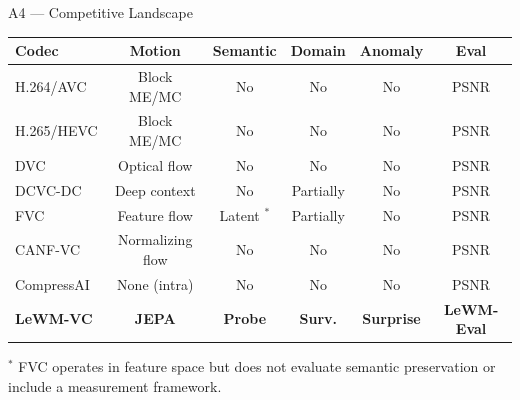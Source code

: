 \documentclass[aspectratio=169, professionalfonts, 10pt]{beamer}
\begin{document}
\begin{frame}{A4 --- Competitive Landscape}

  \begin{tabular}{lccccc}
    \toprule
    \textbf{Codec} & \textbf{Motion} & \textbf{Semantic} & \textbf{Domain} & \textbf{Anomaly} & \textbf{Eval} \\
    \midrule
    H.264/AVC  & Block ME/MC & No & No & No & PSNR \\
    H.265/HEVC & Block ME/MC & No & No & No & PSNR \\
    DVC        & Optical flow & No & No & No & PSNR \\
    DCVC-DC    & Deep context & No & Partially & No & PSNR \\
    FVC        & Feature flow & Latent $^\ast$ & Partially & No & PSNR \\
    CANF-VC    & Normalizing flow & No & No & No & PSNR \\
    CompressAI & None (intra) & No & No & No & PSNR \\
    \midrule
    \textbf{LeWM-VC} & \textbf{JEPA} & \textbf{Probe} & \textbf{Surv.} & \textbf{Surprise} & \textbf{LeWM-Eval} \\
    \bottomrule
  \end{tabular}

  \bigskip
  \vspace{0.5em}
  $^\ast$ FVC operates in feature space but does not evaluate semantic preservation
  or include a measurement framework.
\end{frame}
\end{document}
